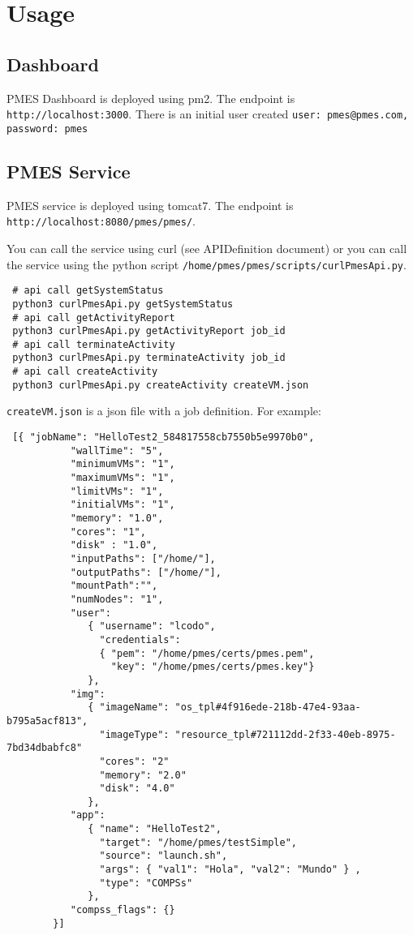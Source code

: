 \documentclass[a4paper,10pt]{article}
\begin{document}
\section{Usage}
\subsection{Dashboard}
PMES Dashboard is  deployed using pm2. The endpoint is \texttt{http://localhost:3000}. There is an initial user created \texttt{user: pmes@pmes.com, password: pmes}

\subsection{PMES Service}
PMES service is  deployed using tomcat7. The endpoint is \texttt{http://localhost:8080/pmes/pmes/}.

You can call the service using curl (see APIDefinition document) or you can call the service using the python script \texttt{/home/pmes/pmes/scripts/curlPmesApi.py}.

\begin{verbatim}
 # api call getSystemStatus
 python3 curlPmesApi.py getSystemStatus
 # api call getActivityReport
 python3 curlPmesApi.py getActivityReport job_id
 # api call terminateActivity
 python3 curlPmesApi.py terminateActivity job_id
 # api call createActivity
 python3 curlPmesApi.py createActivity createVM.json
\end{verbatim}

\texttt{createVM.json} is a json file with a job definition. For example:
\begin{verbatim}
 [{ "jobName": "HelloTest2_584817558cb7550b5e9970b0",
           "wallTime": "5",
           "minimumVMs": "1",
           "maximumVMs": "1",
           "limitVMs": "1",
           "initialVMs": "1",
           "memory": "1.0",
           "cores": "1",
           "disk" : "1.0",
           "inputPaths": ["/home/"],
           "outputPaths": ["/home/"],
           "mountPath":"",
           "numNodes": "1",
           "user":
              { "username": "lcodo",
                "credentials":
                { "pem": "/home/pmes/certs/pmes.pem",
                  "key": "/home/pmes/certs/pmes.key"}
              },
           "img": 
              { "imageName": "os_tpl#4f916ede-218b-47e4-93aa-b795a5acf813", 
                "imageType": "resource_tpl#721112dd-2f33-40eb-8975-7bd34dbabfc8"
                "cores": "2"
                "memory": "2.0"
                "disk": "4.0"
              },
           "app":
              { "name": "HelloTest2",
                "target": "/home/pmes/testSimple",
                "source": "launch.sh",
                "args": { "val1": "Hola", "val2": "Mundo" } ,
                "type": "COMPSs"
              },
           "compss_flags": {}
        }]
\end{verbatim}
\end{document}
